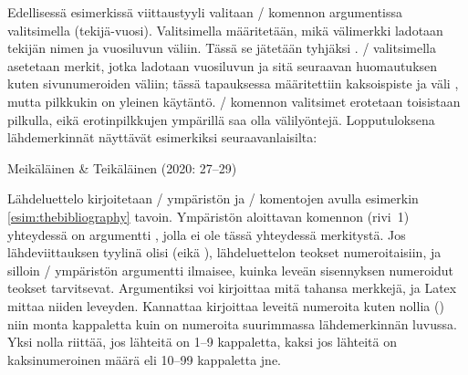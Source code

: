 \begin{koodilohkosis}
\usepackage{natbib}
\end{koodilohkosis}

Edellisessä esimerkissä viittaustyyli valitaan \-/
komennon argumentissa valitsimella 
(tekijä\--vuosi). Valitsimella  määritetään, mikä
välimerkki ladotaan tekijän nimen ja vuosiluvun väliin. Tässä se
jätetään tyhjäksi \koodi{\{\}}. \-/ valitsimella
asetetaan merkit, jotka ladotaan vuosiluvun ja sitä seuraavan
huomautuksen kuten sivunumeroiden väliin; tässä tapauksessa määritettiin
kaksoispiste ja väli \koodi{\{:~\}}, mutta pilkkukin on yleinen
käytäntö. \-/ komennon valitsimet erotetaan
toisistaan pilkulla, eikä erotinpilkkujen ympärillä saa olla
välilyöntejä. Lopputuloksena lähdemerkinnät näyttävät esimerkiksi
seuraavanlaisilta:

\begin{koodilohkosis}
\citet*[27--29]{johdatus} %
\end{koodilohkosis}

\begin{tulossis}
  Meikäläinen \& Teikäläinen (2020: 27--29)
\end{tulossis}

Lähdeluettelo kirjoitetaan \-/ ympäristön ja
\-/ komentojen avulla esimerkin
\ref{esim:thebibliography} tavoin. Ympäristön aloittavan komennon
(rivi~1) yhteydessä on argumentti , jolla ei ole tässä
yhteydessä merkitystä. Jos lähdeviittauksen tyylinä olisi
 (eikä ), lähdeluettelon teokset
numeroitaisiin, ja silloin \-/ ympäristön
argumentti ilmaisee, kuinka leveän sisennyksen numeroidut teokset
tarvitsevat. Argumentiksi voi kirjoittaa mitä tahansa merkkejä, ja Latex
mittaa niiden leveyden. Kannattaa kirjoittaa leveitä numeroita kuten
nollia () niin monta kappaletta kuin on numeroita suurimmassa
lähdemerkinnän luvussa. Yksi nolla riittää, jos lähteitä on 1--9
kappaletta, kaksi jos lähteitä on kaksinumeroinen määrä eli 10--99
kappaletta jne.

